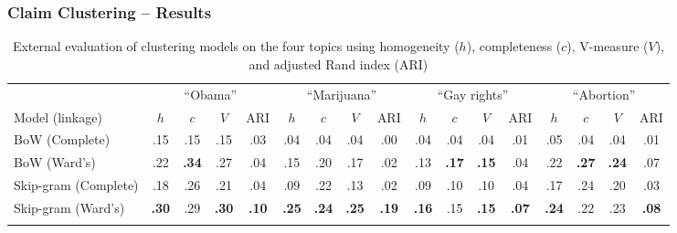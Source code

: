 \documentclass{beamer}
\begin{document}
\begin{frame}
	\frametitle{Claim Clustering -- Results}

\begin{table}[t]
\begin{center}
{\tiny
\setlength{\tabcolsep}{0.5em}
\begin{tabular}{@{}l cccc cccc cccc cccc@{}}
\toprule
& \multicolumn{4}{c}{``Obama''} & \multicolumn{4}{c}{``Marijuana''} &
	\multicolumn{4}{c}{``Gay rights''} & \multicolumn{4}{c}{``Abortion''}
	\\
\cmidrule(lr){2-5}
\cmidrule(lr){6-9}
\cmidrule(lr){10-13}
\cmidrule(lr){14-17}
Model (linkage) &
$h$ & $c$ & $V$ & ARI &
$h$ & $c$ & $V$ & ARI &
$h$ & $c$ & $V$ & ARI &
$h$ & $c$ & $V$ & ARI \\
\midrule
BoW (Complete) &
.15 & .15 & .15 & .03 & 
.04 & .04 & .04 & .00 & 
.04 & .04 & .04 & .01 & 
.05 & .04 & .04 & .01\\
BoW (Ward's) & 
.22 & \textbf{.34} & .27 & .04 & 
.15 & .20 & .17 & .02 & 
.13 & \textbf{.17} & \textbf{.15} & .04 & 
.22 & \textbf{.27} & \textbf{.24} & .07 \\
Skip-gram (Complete) & 
.18 & .26 & .21 & .04 & 
.09 & .22 & .13 & .02 & 
.09 & .10 & .10 & .04 & 
.17 & .24 & .20 & .03  \\
Skip-gram (Ward's) & 
\textbf{.30} & .29 & \textbf{.30} & \textbf{.10} & 
\textbf{.25} & \textbf{.24} & \textbf{.25} & \textbf{.19} & 
\textbf{.16} & .15 & \textbf{.15} & \textbf{.07} & 
\textbf{.24} & .22 & .23 & \textbf{.08} \\
 \\
\bottomrule
\end{tabular}}
\caption{External evaluation of clustering models on the four topics using 
	homogeneity ($h$), completeness ($c$), V-measure ($V$), and adjusted
	Rand index (ARI) }
\label{tab:external-eval}
\end{center}
\end{table}

\end{frame}
\end{document}
